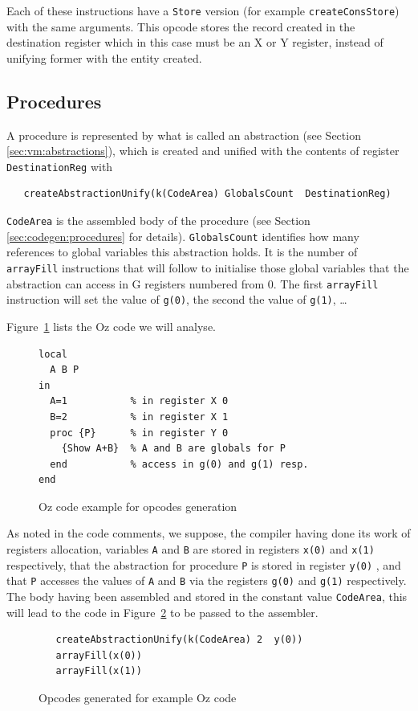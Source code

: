 \documentclass[a4paper]{memoir}
\begin{document}
Each of these instructions have a \lstinline!Store! version (for example
\lstinline!createConsStore!) with the same arguments. This opcode stores the
record created in the destination register which in this case must be an X
or Y register, instead of unifying former with the entity created.

\subsection{Procedures}\label{sec:opcode:procedures}
A procedure is represented by what is called an abstraction (see Section
\ref{sec:vm:abstractions}), which is created and unified with the contents of register
\lstinline!DestinationReg! with
\begin{lstlisting}
   createAbstractionUnify(k(CodeArea) GlobalsCount  DestinationReg)
\end{lstlisting}
\lstinline!CodeArea! is the assembled body of the procedure (see Section
\ref{sec:codegen:procedures} for details). \lstinline!GlobalsCount! identifies
how many references to global variables this abstraction holds. It is the number
of \lstinline!arrayFill! instructions that will follow to initialise those global variables
that the abstraction can access in G registers numbered from 0. The first
\lstinline!arrayFill! instruction will set the value of \lstinline!g(0)!, the
second the value of \lstinline!g(1)!,
\ldots

Figure~\ref{fig:opcodes:procedures:example} lists the Oz code we will analyse.

\begin{figure}[ht]
\begin{lstlisting}
local
  A B P
in
  A=1           % in register X 0
  B=2           % in register X 1
  proc {P}      % in register Y 0
    {Show A+B}  % A and B are globals for P
  end           % access in g(0) and g(1) resp.
end
\end{lstlisting}
\caption{Oz code example for opcodes generation}
\label{fig:opcodes:procedures:example}
\end{figure}


As noted in the code comments, we suppose, the compiler having done its work of
registers allocation, variables \lstinline!A! and \lstinline!B! are stored in
registers \lstinline!x(0)! and \lstinline!x(1)!
respectively, that the abstraction for procedure \lstinline!P! is stored in register \lstinline!y(0)!
, and that \lstinline!P! accesses the values of \lstinline!A! and \lstinline!B!
via the registers \lstinline!g(0)! and \lstinline!g(1)!
respectively.
The body having been assembled and stored in the constant value
\lstinline!CodeArea!, this
will lead to the code in Figure~\ref{fig:opcodes:procedures:result} to be passed
to the assembler.
\begin{figure}[ht]
\begin{lstlisting}
   createAbstractionUnify(k(CodeArea) 2  y(0))
   arrayFill(x(0))
   arrayFill(x(1))
\end{lstlisting}
\caption{Opcodes generated for example Oz code}
\label{fig:opcodes:procedures:result}
\end{figure}
\end{document}
